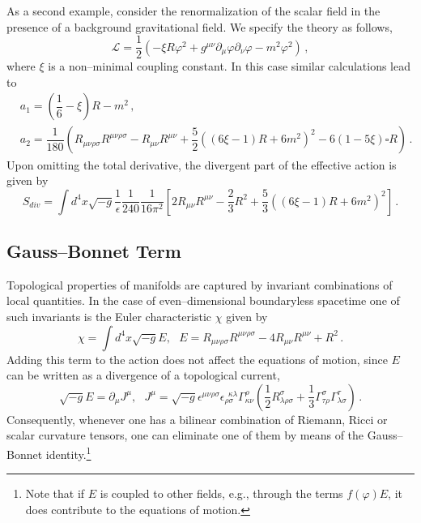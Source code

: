 \documentclass[11pt,a4paper]{article}
\begin{document}
As a second example, consider the renormalization of the scalar field in the presence of a background gravitational field. We specify the theory as follows,
\begin{equation}
\mathcal{L}=\frac{1}{2}(-\xi R\varphi^2+g^{\mu\nu}\partial_\mu\varphi\partial_\nu\varphi-m^2\varphi^2) \,,
\end{equation}
where $\xi$ is a non--minimal coupling constant. In this case similar calculations lead to
\begin{equation}
\begin{split}
&a_1=\left(\dfrac{1}{6}-\xi\right)R-m^2\,,\\
&a_2=\dfrac{1}{180}\left(R_{\mu\nu\rho\sigma}R^{\mu\nu\rho\sigma}
-R_{\mu\nu}R^{\mu\nu}+\dfrac{5}{2}((6\xi-1)R+6m^2)^2
-6(1-5\xi)\square R\right)\,.
\end{split}
\end{equation}
Upon omitting the total derivative, the divergent part of the effective action is given by
\begin{equation}
S_{div}=\int d^4x\sqrt{-g}\dfrac{1}{\epsilon}\dfrac{1}{240}\dfrac{1}{16\pi^2}\left[2R_{\mu\nu}R^{\mu\nu}
-\frac{2}{3}
R^2+\dfrac{5}{3}((6\xi-1)R+6m^2)^2\right] \,.
\end{equation}

\subsection{Gauss--Bonnet Term}
\label{GBTerm}

Topological properties of manifolds are captured by invariant combinations of local quantities.
In the case of even--dimensional boundaryless spacetime one of such invariants is the Euler characteristic $\chi$ given by
\begin{equation}\label{GaussBonnetTerm}
\chi=\int d^4x \sqrt{-g}E,~~~E=R_{\mu\nu\rho\sigma}R^{\mu\nu\rho\sigma}-4R_{\mu\nu}R^{\mu\nu}+R^2 \,.
\end{equation}
Adding this term to the action does not affect the equations of motion, since $E$ can be written as a divergence of a topological current,
\begin{equation}
\sqrt{-g}E=\partial_\mu J^\mu,~~~ J^\mu=\sqrt{-g}\epsilon^{\mu\nu\rho\sigma}\epsilon_{\rho\sigma}^{~~\kappa\lambda}\Gamma^\rho_{\kappa\nu}\left(\dfrac{1}{2}R^\sigma_{\lambda\rho\sigma}+\dfrac{1}{3}\Gamma^\sigma_{\tau\rho}\Gamma^\tau_{\lambda\sigma}\right) \,.
\end{equation}
Consequently, whenever one has a bilinear combination of Riemann, Ricci or scalar curvature tensors, one can eliminate one of them by means of the Gauss--Bonnet identity.\footnote{Note that if $E$ is coupled to other fields, e.g., through the terms $f(\varphi)E$, it does contribute to the equations of motion.}
\end{document}
